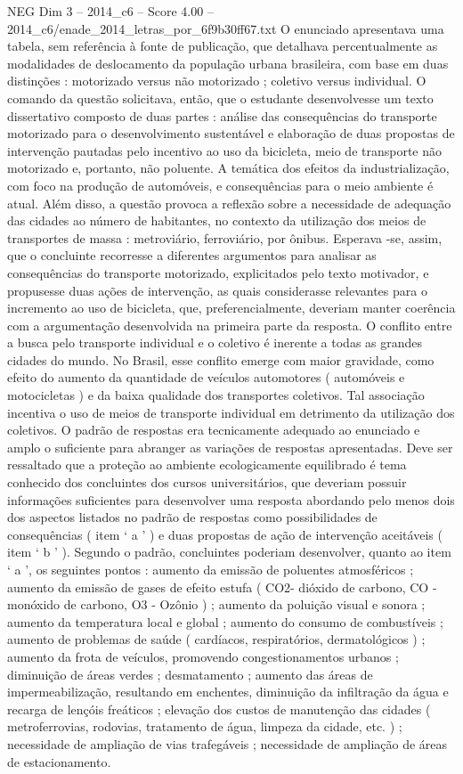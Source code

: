 \begin{textsample}{NEG Dim 3 – 2014\_c6 – Score 4.00 – 2014\_c6/enade\_2014\_letras\_por\_6f9b30ff67.txt}
O enunciado apresentava uma tabela, sem referência à fonte de publicação, que detalhava percentualmente as modalidades de deslocamento da população urbana brasileira, com base em duas distinções : motorizado versus não motorizado ; coletivo versus individual.
O comando da questão solicitava, então, que o estudante desenvolvesse um texto dissertativo composto de duas partes : análise das consequências do transporte motorizado para o desenvolvimento sustentável e elaboração de duas propostas de intervenção pautadas pelo incentivo ao uso da bicicleta, meio de transporte não motorizado e, portanto, não poluente.
A temática dos efeitos da industrialização, com foco na produção de automóveis, e consequências para o meio ambiente é atual.
Além disso, a questão provoca a reflexão sobre a necessidade de adequação das cidades ao número de habitantes, no contexto da utilização dos meios de transportes de massa : metroviário, ferroviário, por ônibus.
Esperava -se, assim, que o concluinte recorresse a diferentes argumentos para analisar as consequências do transporte motorizado, explicitados pelo texto motivador, e propusesse duas ações de intervenção, as quais considerasse relevantes para o incremento ao uso de bicicleta, que, preferencialmente, deveriam manter coerência com a argumentação desenvolvida na primeira parte da resposta.
O conflito entre a busca pelo transporte individual e o coletivo é inerente a todas as grandes cidades do mundo.
No Brasil, esse conflito emerge com maior gravidade, como efeito do aumento da quantidade de veículos automotores ( automóveis e motocicletas ) e da baixa qualidade dos transportes coletivos.
Tal associação incentiva o uso de meios de transporte individual em detrimento da utilização dos coletivos.
O padrão de respostas era tecnicamente adequado ao enunciado e amplo o suficiente para abranger as variações de respostas apresentadas.
Deve ser ressaltado que a proteção ao ambiente ecologicamente equilibrado é tema conhecido dos concluintes dos cursos universitários, que deveriam possuir informações suficientes para desenvolver uma resposta abordando pelo menos dois dos aspectos listados no padrão de respostas como possibilidades de consequências ( item ‘ a ’ ) e duas propostas de ação de intervenção aceitáveis ( item ‘ b ’ ).
Segundo o padrão, concluintes poderiam desenvolver, quanto ao item ‘ a ’, os seguintes pontos : aumento da emissão de poluentes atmosféricos ; aumento da emissão de gases de efeito estufa ( CO2- dióxido de carbono, CO - monóxido de carbono, O3 - Ozônio ) ; aumento da poluição visual e sonora ; aumento da temperatura local e global ; aumento do consumo de combustíveis ; aumento de problemas de saúde ( cardíacos, respiratórios, dermatológicos ) ; aumento da frota de veículos, promovendo congestionamentos urbanos ; diminuição de áreas verdes ; desmatamento ; aumento das áreas de impermeabilização, resultando em enchentes, diminuição da infiltração da água e recarga de lençóis freáticos ; elevação dos custos de manutenção das cidades ( metroferrovias, rodovias, tratamento de água, limpeza da cidade, etc. ) ; necessidade de ampliação de vias trafegáveis ; necessidade de ampliação de áreas de estacionamento.

\end{textsample}
